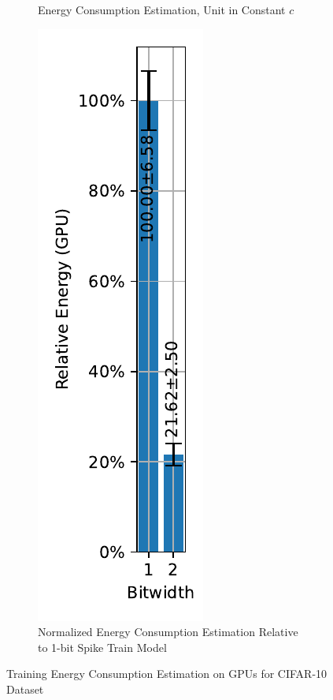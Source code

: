 \begin{figure}[H]
\begin{subfigure}[H]{0.48\textwidth}
                \caption{Energy Consumption Estimation, Unit in Constant $c$}
            \end{subfigure}
            \hfill
            \begin{subfigure}[H]{0.48\textwidth}
                \includegraphics[width=\textwidth]{../timesteps/CIFAR10/plots/cifar10_train_relative_energy_gpu.pdf}
                \caption{Normalized Energy Consumption Estimation Relative to 1-bit Spike Train Model}
            \end{subfigure}
            \caption{Training Energy Consumption Estimation on GPUs for CIFAR-10 Dataset}
        \end{figure}

